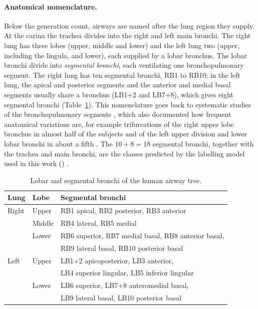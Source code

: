 \paragraph{Anatomical nomenclature.}     %
Below the generation count, airways are named after the lung region they supply. At the carina
the trachea divides into the right and left main bronchi. The right lung has three lobes
(upper, middle and lower) and the left lung two (upper, including the lingula, and lower), each
supplied by a lobar bronchus. The lobar bronchi divide into \emph{segmental bronchi}, each
ventilating one bronchopulmonary segment. The right lung has ten segmental bronchi, RB1 to
RB10; in the left lung, the apical and posterior segments and the anterior and medial basal
segments usually share a bronchus (LB1+2 and LB7+8), which gives eight segmental bronchi
(Table~\ref{tab:segmental_bronchi}). This nomenclature goes back to systematic studies of the
bronchopulmonary segments \cite{boyden1949}, which also documented how frequent anatomical
variations are, for example trifurcations of the right upper lobe bronchus in almost half of
the subjects \cite{boyden1949} and of the left upper division and lower lobar bronchi in about
a fifth \cite{zhao2009}. The $10+8=18$ segmental bronchi, together with the trachea and main
bronchi, are the classes predicted by the labelling model used in this work
() \cite{xie2025}.

\begin{table}[htbp]                      %
  \centering                             %
  \small                                 %
  \caption{Lobar and segmental bronchi of the human airway tree.}
  \label{tab:segmental_bronchi}          %
  \begin{tabular}{lll}                   %
    \toprule
    Lung  & Lobe   & Segmental bronchi \\
    \midrule
    Right & Upper  & RB1 apical, RB2 posterior, RB3 anterior \\
          & Middle & RB4 lateral, RB5 medial \\
          & Lower  & RB6 superior, RB7 medial basal, RB8 anterior basal, \\
          &        & RB9 lateral basal, RB10 posterior basal \\
    \midrule
    Left  & Upper  & LB1+2 apicoposterior, LB3 anterior, \\
          &        & LB4 superior lingular, LB5 inferior lingular \\
          & Lower  & LB6 superior, LB7+8 anteromedial basal, \\
          &        & LB9 lateral basal, LB10 posterior basal \\
    \bottomrule
  \end{tabular}
\end{table}

